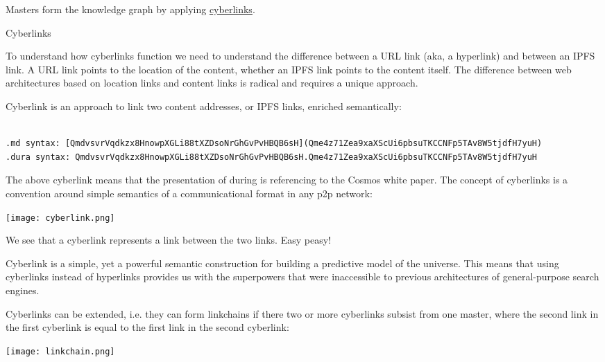 \documentclass[8pt,oneside]{amsart}
\makeatletter
\newcommand{\linkred}[2]{\href{#1}{\color{red}{#2}}}
\renewcommand\subsection{\@startsection{subsection}
                                    {2}{\z@}
                                    {-3.25ex\@plus -1ex \@minus -.2ex}
                                    {0ex \@plus .2ex}
                                    {\play\Large}
                        }
\newcommand{\titleSection}[1]{\subsection{#1}}
\newenvironment{Figure}
  {\par\medskip\noindent\minipage{\linewidth}}
  {\endminipage\par\medskip}
\makeatother
\begin{document}
Masters form the knowledge graph by applying {\hyperref[cyberlinks]{cyberlinks}}.

\titleSection{Cyberlinks}\label{cyberlinks}

To understand how cyberlinks function we need to understand the difference between a URL link (aka, a hyperlink) and between an IPFS link. A URL link points to the location of the content, whether an IPFS link points to the content itself. The difference between web architectures based on location links and content links is radical and requires a unique approach.

Cyberlink is an approach to link two content addresses, or IPFS links, enriched semantically:

\begin{lstlisting}

.md syntax: [QmdvsvrVqdkzx8HnowpXGLi88tXZDsoNrGhGvPvHBQB6sH](Qme4z71Zea9xaXScUi6pbsuTKCCNFp5TAv8W5tjdfH7yuH)
.dura syntax: QmdvsvrVqdkzx8HnowpXGLi88tXZDsoNrGhGvPvHBQB6sH.Qme4z71Zea9xaXScUi6pbsuTKCCNFp5TAv8W5tjdfH7yuH
\end{lstlisting}

The above cyberlink means that the presentation of \linkred{https://github.com/cybercongress/go-cyber}{go-cyber} during \linkred{https://etherscan.io/token/0x61B81103e716B611Fff8aF5A5Dc8f37C628efb1E}{cyberc0n} is referencing to the Cosmos white paper. The concept of cyberlinks is a convention around simple semantics of a communicational format in any p2p network:

\begin{Figure}
    \centering
    \texttt{[image: cyberlink.png]}
\end{Figure}

We see that a cyberlink represents a link between the two links. Easy peasy!

Cyberlink is a simple, yet a powerful semantic construction for building a predictive model of the universe. This means that using cyberlinks instead of hyperlinks provides us with the superpowers that were inaccessible to previous architectures of general-purpose search engines.

Cyberlinks can be extended, i.e. they can form linkchains if there two or more cyberlinks subsist from one master, where the second link in the first cyberlink is equal to the first link in the second cyberlink:

\begin{Figure}
    \centering
    \texttt{[image: linkchain.png]}
\end{Figure}
\end{document}

